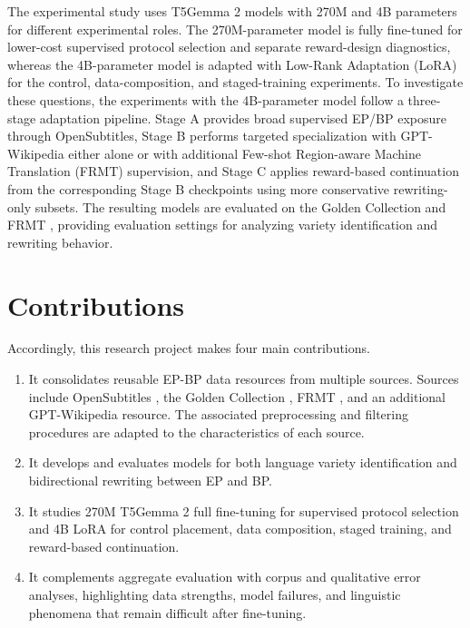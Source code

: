 The experimental study uses T5Gemma 2 models with 270M and 4B parameters for
different experimental roles. The 270M-parameter model is fully fine-tuned for lower-cost supervised protocol
selection and separate reward-design diagnostics, whereas the 4B-parameter
model is adapted with Low-Rank Adaptation (LoRA) \citep{hu2022lora} for the
control, data-composition, and staged-training
experiments. To investigate these questions, the experiments with the 4B-parameter model
follow a three-stage adaptation pipeline. Stage A provides broad supervised EP/BP exposure through
OpenSubtitles, Stage B performs targeted specialization with GPT-Wikipedia
either alone or with additional Few-shot Region-aware Machine Translation (FRMT) supervision, and Stage C applies
reward-based continuation from the corresponding Stage B checkpoints using
more conservative rewriting-only subsets. The resulting models are evaluated
on the Golden Collection
\citep{sanches2024brazilianportugueseeuropeanportuguese} and FRMT
\citep{riley2023frmtbenchmarkfewshotregionaware}, providing
evaluation settings for analyzing variety identification and rewriting behavior.


\section{Contributions}
\label{sec:intro-contributions}

Accordingly, this research project makes four main contributions.

\begin{enumerate}
    \item It consolidates reusable EP-BP data resources from multiple sources.
    Sources include OpenSubtitles \citep{4992de1b5fb34f3e9691772606b36edf},
    the Golden Collection
    \citep{sanches2024brazilianportugueseeuropeanportuguese}, FRMT
    \citep{riley2023frmtbenchmarkfewshotregionaware}, and an additional
    GPT-Wikipedia resource. The associated preprocessing and filtering\hfil\break
    procedures are adapted to the characteristics of each source.
    \item It develops and evaluates models for both\hfil\break
    language variety
    identification and bidirectional rewriting between EP and BP.
    \item It studies 270M T5Gemma 2 full fine-tuning for supervised protocol selection and
4B LoRA for control placement, data composition, staged training, and
reward-based continuation.
    \item It complements aggregate evaluation with corpus and qualitative error
    analyses, highlighting data strengths, model failures, and linguistic
    phenomena that remain difficult after fine-tuning.
\end{enumerate}

